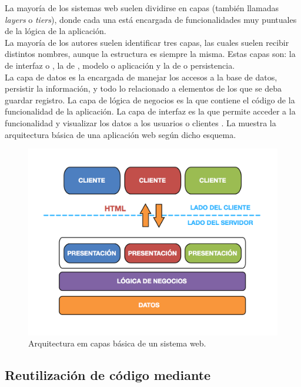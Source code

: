 La mayoría de los sistemas web suelen dividirse en capas (también llamadas
\emph{layers} o \emph{tiers}), donde cada una está encargada de 
funcionalidades muy puntuales de la lógica de la aplicación.\\
La mayoría de los autores suelen identificar tres capas, las cuales suelen 
recibir distintos nombres, aunque la estructura es siempre la misma. Estas 
capas son: la de interfaz o \view, la de \logic, modelo o aplicación y la de 
\data o persistencia.\\
La capa de datos es la encargada de manejar los accesos a la base de datos, 
persistir la información, y todo lo relacionado a elementos de los que se deba 
guardar registro. La capa de lógica de negocios es la que contiene el código de 
la funcionalidad de la aplicación. La capa de interfaz es la que permite 
acceder a la funcionalidad y visualizar los datos a los usuarios o clientes 
. La  
muestra la arquitectura básica de una aplicación web según dicho esquema.\\

\begin{figure}[tb]
	\centering
	\includegraphics[]{figures/web_arch.png}
	\caption{Arquitectura em capas básica de un sistema web.}
	\label{fig:intro:jvm:web_arch}
\end{figure}
 
\subsection{Reutilización de código mediante \dependencies}
\label{subsec:intro:jvm_dev:dependencies}

